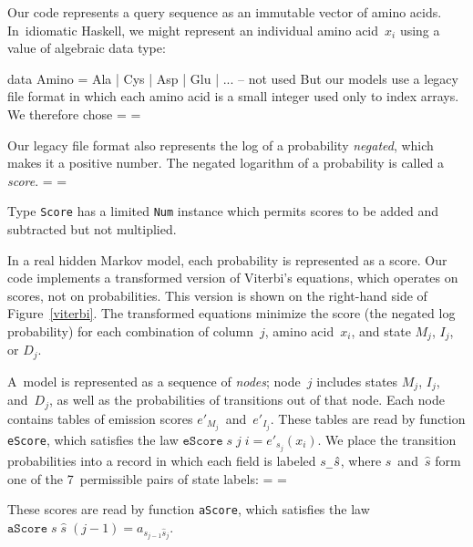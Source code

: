 \documentclass[preprint,nonatbib,blockstyle,times]{sigplanconf}
\newcommand\txprobj[3][]{a#1_{{#2}_{j-1}{#3}_j}}
\newcommand\figref[1]{Figure~\ref{#1}}
\newif\ifverbatimsmall
\newenvironment{smallverbatim}{\par\small\verbatimsmalltrue\verbatim}{\endverbatim}
\newcommand\smallverbatiminput[1]{%
  \verbatimsmalltrue
  \presvtopsep=\topsep
  \topsep=0.78\topsep
  \verbatimsmallfalse
  \topsep=\presvtopsep
}
\begin{document}
Our code represents a query sequence as an immutable vector of amino
acids.
In~idiomatic Haskell, 
we might represent an individual amino acid~$x_i$
using a value of algebraic data type:
\begin{smallverbatim}
data Amino = Ala | Cys | Asp | Glu | ...   -- not used
\end{smallverbatim}
But our models use a
legacy file format in which each amino acid is a small integer
used only to index arrays.
We therefore chose 
\smallverbatiminput{aa}


Our legacy file format also represents
the log of a probability \emph{negated}, which makes it a positive number.
The negated logarithm of a probability is called a \emph{score}.
\smallverbatiminput{score}
Type \texttt{Score} has a limited \texttt{Num} instance which permits
scores to be added and subtracted but not multiplied.

In a real hidden Markov model, each probability is represented as a score.
Our code implements a transformed version of Viterbi's equations, 
which operates on scores, not on probabilities.
This version is
shown on the right-hand side of \figref{viterbi}.
The transformed equations minimize the
score (the negated log probability) for each combination of
column~$j$, amino 
acid~$x_i$, and state $M_j$, $I_j$, or $D_j$.

A~model is represented as a sequence of \emph{nodes};
node~$j$ includes states $M_j$, $I_j$, and~$D_j$,
as well as the probabilities of transitions out of that node.
Each node contains tables of emission scores
$e'_{M_j}$~and~$e'_{I_j}$.
These tables are read by function
\texttt{eScore}, which satisfies
the law %
\mbox{$\mathtt{eScore}\;s\;j\;i = e'_{s_j}(x_i)$}.
%
We place the transition probabilities 
into a record in which each field is labeled
\texttt{$s$\_$\mskip 1mu\hat s$},
where $s$~and~$\hat s$ form one of the 7~permissible pairs of state
labels: 
\smallverbatiminput{tprob-tprobs}
These scores are read by
function \texttt{aScore}, 
which satisfies
the law %
\mbox{$\mathtt{aScore}\;s\;\hat s\;(j-1) = \txprobj s {\hat s}$}.
\end{document}
